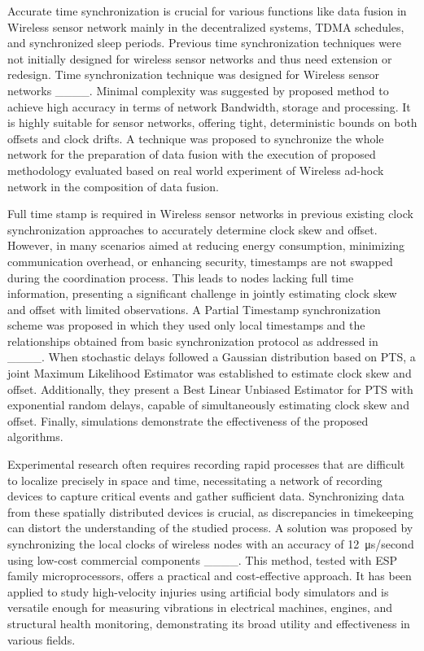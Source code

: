 Accurate time synchronization is crucial for various functions like data fusion in Wireless sensor network mainly in the decentralized systems, TDMA schedules, and synchronized sleep periods. Previous time synchronization techniques were not initially designed for wireless sensor networks and thus need extension or redesign. Time synchronization technique was designed for Wireless sensor networks ____. Minimal complexity was suggested by proposed method to achieve high accuracy in terms of network Bandwidth, storage and processing. It is highly suitable for sensor networks, offering tight, deterministic bounds on both offsets and clock drifts. A technique was proposed to synchronize the whole network for the preparation of data fusion with the execution of proposed methodology evaluated based on real world experiment of Wireless ad-hock network in the composition of data fusion.

Full time stamp is required in Wireless sensor networks in previous existing clock synchronization approaches to accurately determine clock skew and offset. However, in many scenarios aimed at reducing energy consumption, minimizing communication overhead, or enhancing security, timestamps are not swapped during the coordination process. This leads to nodes lacking full time information, presenting a significant challenge in jointly estimating clock skew and offset with limited observations. A Partial Timestamp synchronization scheme was proposed in which they used only local timestamps and the relationships obtained from basic synchronization protocol as addressed in ____. When stochastic delays followed a Gaussian distribution based on PTS, a 
joint Maximum Likelihood Estimator was established to estimate clock skew and offset. Additionally, they present a Best Linear Unbiased 
Estimator for PTS with exponential random delays, capable of simultaneously estimating clock skew and offset. Finally, simulations demonstrate the effectiveness of the proposed algorithms.

Experimental research often requires recording rapid processes that are difficult to localize precisely in space and time, necessitating a network of recording devices to capture critical events and gather sufficient data. Synchronizing data from these spatially distributed devices is crucial, as discrepancies in timekeeping can distort the understanding of the studied process. A solution was proposed by synchronizing the local clocks of wireless nodes with an accuracy of  \SI{12}{\micro\second}/second using low-cost commercial components ____. This method, tested with ESP family microprocessors, offers a practical and cost-effective approach. It has been applied to study high-velocity injuries using artificial body simulators and is versatile enough for measuring vibrations in electrical machines, engines, and structural health monitoring, demonstrating its broad utility and effectiveness in various fields.

